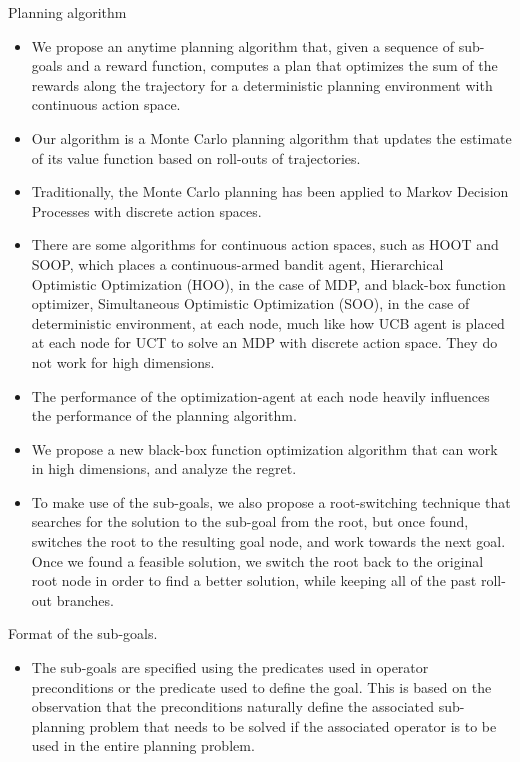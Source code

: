 \documentclass[10pt,letterpaper]{article}
\begin{document}
Planning algorithm
\begin{itemize}
\item We propose an anytime planning algorithm that, given a sequence of 
sub-goals and a reward function,
computes a plan that optimizes the sum of the rewards along the trajectory
for a deterministic planning environment with continuous action space.
\item Our algorithm is a Monte Carlo planning algorithm that updates the estimate  of
its value function based on roll-outs of trajectories.
\item Traditionally, the Monte Carlo planning has been applied to Markov Decision Processes with
discrete action spaces.
\item There are some algorithms for continuous action spaces, such as HOOT and SOOP,
which places a continuous-armed bandit agent, Hierarchical Optimistic Optimization (HOO), 
in the case of MDP,  and black-box function optimizer, 
Simultaneous Optimistic Optimization (SOO), in the case of deterministic 
environment, at each node, much like how
UCB agent is placed at each node for UCT to solve an MDP with discrete action space. 
They do not work for high dimensions. 
\item The performance of the optimization-agent at
each node heavily influences the performance of the planning algorithm.
\item We propose a new black-box function optimization algorithm that can work in
high dimensions, and analyze the regret.
\item To make use of the sub-goals, we also propose a 
root-switching technique that searches for the solution to the sub-goal from the root,
but once found, switches the root to the resulting goal node, and work towards the next goal.
Once we found a feasible solution, we switch the root back to the original root node
in order to find a better solution, while keeping all of the past roll-out branches.
\end{itemize}

Format of the sub-goals.
\begin{itemize}
\item The sub-goals are specified using the predicates used in operator preconditions
 or the predicate used to define the goal. This is based on the observation that
the preconditions naturally define the associated sub-planning problem that needs
to be solved if the associated operator is to be used in the entire planning problem.
\end{itemize}
\end{document}

